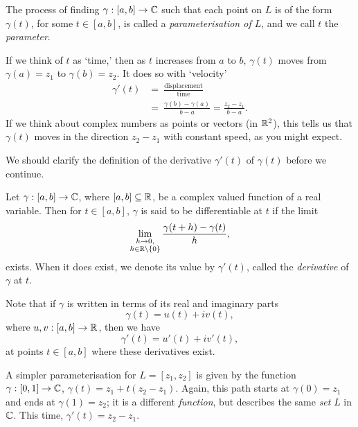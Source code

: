 The process of finding $\gamma : [a,b] \to \mathbb{C}$ such that each point on $L$ is of the form $\gamma (t)$, for some $t \in [a,b]$, is called a \emph{parameterisation of $L$}, and we call $t$ the \emph{parameter}.

If we think of $t$ as `time,' then as $t$ increases from $a$ to $b$, $\gamma (t)$ moves from $\gamma (a) = z_1$ to $\gamma (b) = z_2$.  It does so with `velocity'
\begin{align*}
\gamma'(t) &=\ \frac{\text{displacement}}{\text{time}} \\[2ex]
& =\  \frac{\gamma (b) - \gamma (a)}{b-a} = \frac{z_2  - z_1}{b-a}.
\end{align*}
If we think about complex numbers as points or vectors (in $\mathbb{R}^2$), this tells us that $\gamma (t)$ moves in the direction $z_2-z_1$ with constant speed, as you might expect.

We should clarify the definition of the derivative $\gamma'(t)$ of $\gamma(t)$ before we continue.
\begin{definition}
Let $\gamma:[a,b] \to \mathbb{C}$, where $[a,b] \subseteq \mathbb{R}$, be a complex valued function of a real variable.  Then for $t \in [a,b]$, $\gamma$ is said to be differentiable at $t$ if the limit
\[
\lim_{\substack{h \to 0, \\ h \in \mathbb{R} \backslash \left\{0\right\}}} \frac{\gamma (t+h)-\gamma(t)}{h},
\]
exists.  When it does exist, we denote its value by $\gamma'(t)$, called the \emph{derivative} of $\gamma$ at $t$.
\end{definition}
Note that if $\gamma$ is written in terms of its real and imaginary parts
\[
\gamma(t) = u(t) + i v(t),
\]
where $u,v:[a,b] \to \mathbb{R}$, then we have
\[
\gamma'(t) = u'(t) +i v'(t),
\]
at points $t \in [a,b]$ where these derivatives exist.
\begin{example}
\label{e:path2}
A simpler parameterisation for $L=[z_1, z_2]$ is given by the function $\gamma :[0,1] \to \mathbb{C}$, $\gamma(t)=z_1+t(z_2-z_1)$.  Again, this path starts at $\gamma(0)=z_1$ and ends at $\gamma(1)=z_2$; it is a different \emph{function}, but describes the same \emph{set} $L$ in $\mathbb{C}$. This time, $\gamma'(t)=z_2-z_1$.


\end{example}

